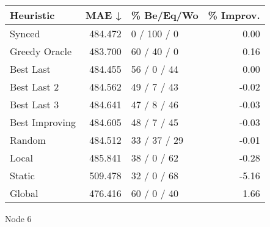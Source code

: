 \begin{tabular}{lrlr}
\toprule
\textbf{Heuristic} & \textbf{MAE ↓} & \textbf{\% Be/Eq/Wo} & \textbf{\% Improv.} \\
\midrule
            Synced &        484.472 &          0 / 100 / 0 &                0.00 \\
     Greedy Oracle &        483.700 &          60 / 40 / 0 &                0.16 \\
         Best Last &        484.455 &          56 / 0 / 44 &                0.00 \\
       Best Last 2 &        484.562 &          49 / 7 / 43 &               -0.02 \\
       Best Last 3 &        484.641 &          47 / 8 / 46 &               -0.03 \\
    Best Improving &        484.605 &          48 / 7 / 45 &               -0.03 \\
            Random &        484.512 &         33 / 37 / 29 &               -0.01 \\
             Local &        485.841 &          38 / 0 / 62 &               -0.28 \\
            Static &        509.478 &          32 / 0 / 68 &               -5.16 \\
            Global &        476.416 &          60 / 0 / 40 &                1.66 \\
\bottomrule
\end{tabular}
\caption{Node 6}
\label{tab:iid_lr01_le1_bs2_6}
